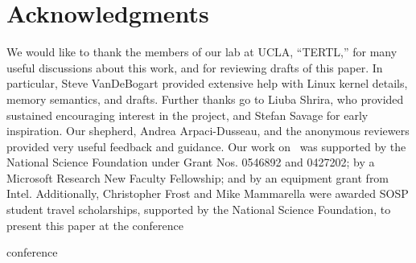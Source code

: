 \section*{Acknowledgments}

We would like to thank the members of our lab at UCLA, ``TERTL,'' for many
useful discussions about this work, and for reviewing drafts of this paper. In
particular, Steve VanDeBogart provided extensive help with Linux
kernel details, memory semantics, and drafts. Further thanks go to Liuba
Shrira, who provided sustained encouraging interest in the project, and
Stefan Savage for early inspiration.
Our shepherd, Andrea Arpaci-Dusseau, and the anonymous reviewers
provided very useful feedback and guidance.
%
Our work on \Kudos\ was supported by the National Science
 Foundation under Grant Nos. 0546892 and 0427202; by a Microsoft Research
 New Faculty Fellowship; and by an equipment grant from Intel.
%
Additionally, Christopher Frost and Mike Mammarella were awarded SOSP student
travel scholarships, supported by the National Science Foundation, to present
this paper at the
\ifpdf
conference

\else
conference

\fi


